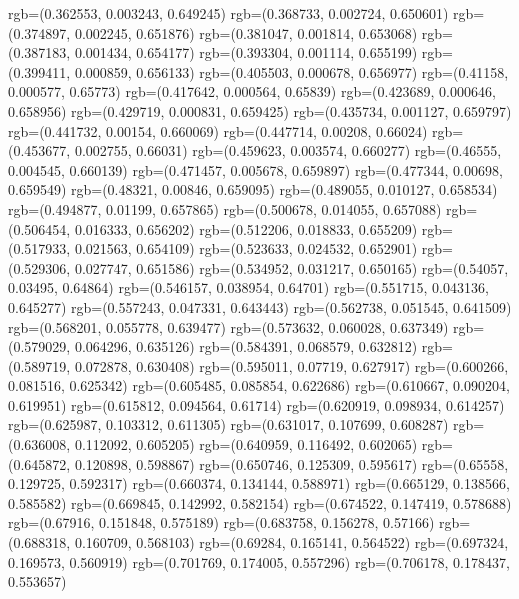 {{{      rgb=(0.362553, 0.003243, 0.649245)
      rgb=(0.368733, 0.002724, 0.650601)
      rgb=(0.374897, 0.002245, 0.651876)
      rgb=(0.381047, 0.001814, 0.653068)
      rgb=(0.387183, 0.001434, 0.654177)
      rgb=(0.393304, 0.001114, 0.655199)
      rgb=(0.399411, 0.000859, 0.656133)
      rgb=(0.405503, 0.000678, 0.656977)
      rgb=(0.41158, 0.000577, 0.65773)
      rgb=(0.417642, 0.000564, 0.65839)
      rgb=(0.423689, 0.000646, 0.658956)
      rgb=(0.429719, 0.000831, 0.659425)
      rgb=(0.435734, 0.001127, 0.659797)
      rgb=(0.441732, 0.00154, 0.660069)
      rgb=(0.447714, 0.00208, 0.66024)
      rgb=(0.453677, 0.002755, 0.66031)
      rgb=(0.459623, 0.003574, 0.660277)
      rgb=(0.46555, 0.004545, 0.660139)
      rgb=(0.471457, 0.005678, 0.659897)
      rgb=(0.477344, 0.00698, 0.659549)
      rgb=(0.48321, 0.00846, 0.659095)
      rgb=(0.489055, 0.010127, 0.658534)
      rgb=(0.494877, 0.01199, 0.657865)
      rgb=(0.500678, 0.014055, 0.657088)
      rgb=(0.506454, 0.016333, 0.656202)
      rgb=(0.512206, 0.018833, 0.655209)
      rgb=(0.517933, 0.021563, 0.654109)
      rgb=(0.523633, 0.024532, 0.652901)
      rgb=(0.529306, 0.027747, 0.651586)
      rgb=(0.534952, 0.031217, 0.650165)
      rgb=(0.54057, 0.03495, 0.64864)
      rgb=(0.546157, 0.038954, 0.64701)
      rgb=(0.551715, 0.043136, 0.645277)
      rgb=(0.557243, 0.047331, 0.643443)
      rgb=(0.562738, 0.051545, 0.641509)
      rgb=(0.568201, 0.055778, 0.639477)
      rgb=(0.573632, 0.060028, 0.637349)
      rgb=(0.579029, 0.064296, 0.635126)
      rgb=(0.584391, 0.068579, 0.632812)
      rgb=(0.589719, 0.072878, 0.630408)
      rgb=(0.595011, 0.07719, 0.627917)
      rgb=(0.600266, 0.081516, 0.625342)
      rgb=(0.605485, 0.085854, 0.622686)
      rgb=(0.610667, 0.090204, 0.619951)
      rgb=(0.615812, 0.094564, 0.61714)
      rgb=(0.620919, 0.098934, 0.614257)
      rgb=(0.625987, 0.103312, 0.611305)
      rgb=(0.631017, 0.107699, 0.608287)
      rgb=(0.636008, 0.112092, 0.605205)
      rgb=(0.640959, 0.116492, 0.602065)
      rgb=(0.645872, 0.120898, 0.598867)
      rgb=(0.650746, 0.125309, 0.595617)
      rgb=(0.65558, 0.129725, 0.592317)
      rgb=(0.660374, 0.134144, 0.588971)
      rgb=(0.665129, 0.138566, 0.585582)
      rgb=(0.669845, 0.142992, 0.582154)
      rgb=(0.674522, 0.147419, 0.578688)
      rgb=(0.67916, 0.151848, 0.575189)
      rgb=(0.683758, 0.156278, 0.57166)
      rgb=(0.688318, 0.160709, 0.568103)
      rgb=(0.69284, 0.165141, 0.564522)
      rgb=(0.697324, 0.169573, 0.560919)
      rgb=(0.701769, 0.174005, 0.557296)
      rgb=(0.706178, 0.178437, 0.553657)
}}}
